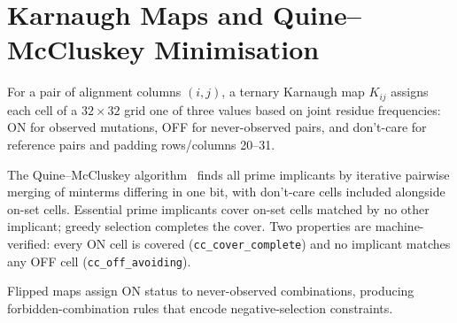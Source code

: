 \section{Karnaugh Maps and Quine--McCluskey Minimisation}
\label{sec:theory-kmap-qm}

For a pair of alignment columns $(i,j)$, a ternary Karnaugh map $K_{ij}$
assigns each cell of a $32\times32$ grid one of three values based on joint
residue frequencies: ON for observed mutations, OFF for never-observed pairs,
and don't-care for reference pairs and padding rows/columns 20--31.

The Quine--McCluskey algorithm~\cite{quine1952,mccluskey1956} finds all prime
implicants by iterative pairwise merging of minterms differing in one bit,
with don't-care cells included alongside on-set cells.  Essential prime
implicants cover on-set cells matched by no other implicant; greedy selection
completes the cover.  Two properties are machine-verified: every ON cell is
covered (\texttt{cc\_cover\_complete}) and no implicant matches any OFF cell
(\texttt{cc\_off\_avoiding}).

Flipped maps assign ON status to never-observed combinations, producing
forbidden-combination rules that encode negative-selection constraints.

